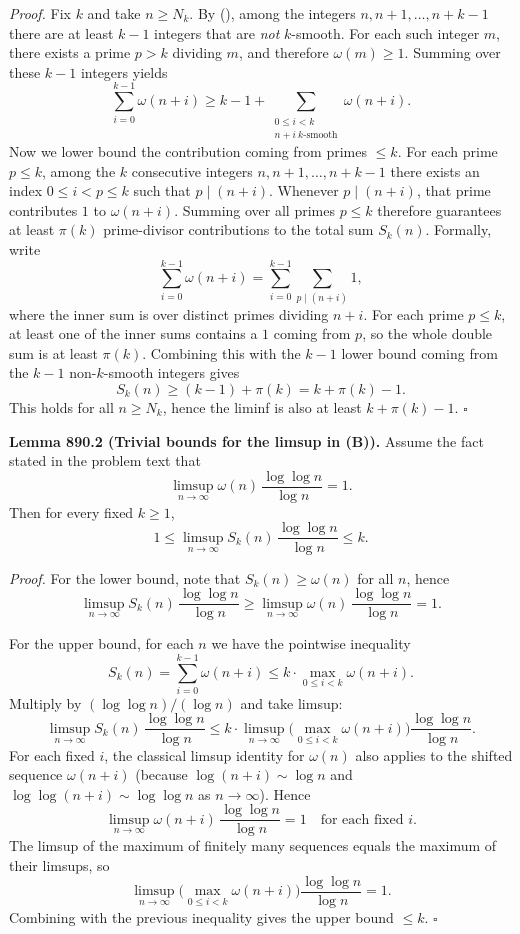 \noindent \emph{Proof.}
Fix $k$ and take $n\ge N_k$.
By (\*), among the integers $n,n+1,\dots,n+k-1$ there are at least $k-1$ integers that are \emph{not} $k$-smooth. For each such integer $m$, there exists a prime $p>k$ dividing $m$, and therefore $\omega(m)\ge 1$.
Summing over these $k-1$ integers yields
\[
\sum_{i=0}^{k-1} \omega(n+i) \ge k-1 + \sum_{\substack{0\le i<k\\ n+i\ \text{$k$-smooth}}} \omega(n+i).
\]
Now we lower bound the contribution coming from primes $\le k$.
For each prime $p\le k$, among the $k$ consecutive integers $n,n+1,\dots,n+k-1$ there exists an index $0\le i<p\le k$ such that $p\mid(n+i)$.
Whenever $p\mid(n+i)$, that prime contributes $1$ to $\omega(n+i)$.
Summing over all primes $p\le k$ therefore guarantees at least $\pi(k)$ prime-divisor contributions to the total sum $S_k(n)$.
Formally, write
\[
\sum_{i=0}^{k-1} \omega(n+i) = \sum_{i=0}^{k-1} \sum_{p\mid(n+i)} 1,
\]
where the inner sum is over distinct primes dividing $n+i$. For each prime $p\le k$, at least one of the inner sums contains a $1$ coming from $p$, so the whole double sum is at least $\pi(k)$. Combining this with the $k-1$ lower bound coming from the $k-1$ non-$k$-smooth integers gives
\[
S_k(n)\ge (k-1)+\pi(k)=k+\pi(k)-1.
\]
This holds for all $n\ge N_k$, hence the liminf is also at least $k+\pi(k)-1$.
\hfill$\square$

\medskip
\noindent \textbf{Lemma 890.2 (Trivial bounds for the limsup in (B)).}
Assume the fact stated in the problem text that
\[
\limsup_{n\to\infty} \omega(n)\,\frac{\log\log n}{\log n}=1.
\]
Then for every fixed $k\ge 1$,
\[
1 \le \limsup_{n\to\infty} S_k(n)\,\frac{\log\log n}{\log n} \le k.
\]

\noindent \emph{Proof.}
For the lower bound, note that $S_k(n)\ge \omega(n)$ for all $n$, hence
\[
\limsup_{n\to\infty} S_k(n)\,\frac{\log\log n}{\log n}
\ge \limsup_{n\to\infty} \omega(n)\,\frac{\log\log n}{\log n}=1.
\]

For the upper bound, for each $n$ we have the pointwise inequality
\[
S_k(n)=\sum_{i=0}^{k-1}\omega(n+i) \le k\cdot \max_{0\le i<k}\omega(n+i).
\]
Multiply by $(\log\log n)/(\log n)$ and take limsup:
\[
\limsup_{n\to\infty} S_k(n)\,\frac{\log\log n}{\log n}
\le k\cdot \limsup_{n\to\infty} \Big(\max_{0\le i<k}\omega(n+i)\Big)\frac{\log\log n}{\log n}.
\]
For each fixed $i$, the classical limsup identity for $\omega(n)$ also applies to the shifted sequence $\omega(n+i)$ (because $\log(n+i)\sim \log n$ and $\log\log(n+i)\sim \log\log n$ as $n\to\infty$).
Hence
\[
\limsup_{n\to\infty} \omega(n+i)\,\frac{\log\log n}{\log n}=1\quad\text{for each fixed }i.
\]
The limsup of the maximum of finitely many sequences equals the maximum of their limsups, so
\[
\limsup_{n\to\infty} \Big(\max_{0\le i<k}\omega(n+i)\Big)\frac{\log\log n}{\log n} = 1.
\]
Combining with the previous inequality gives the upper bound $\le k$.
\hfill$\square$


